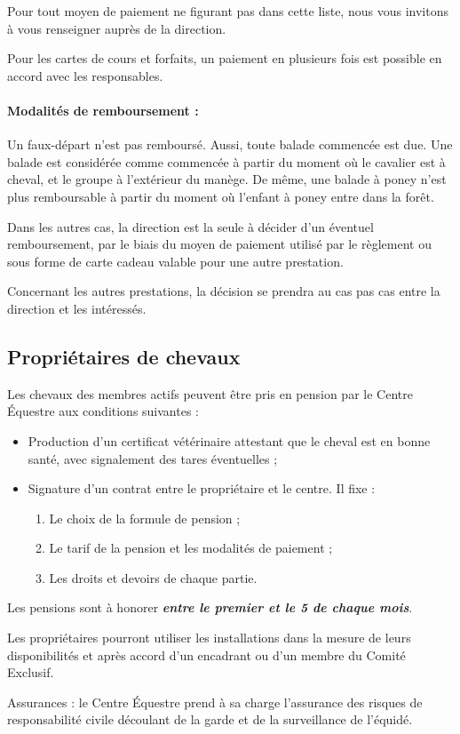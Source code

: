 \documentclass[11pt,a4paper]{article}
\begin{document}
Pour tout moyen de paiement ne figurant pas dans cette liste, nous vous invitons à vous renseigner auprès de la direction.

Pour les cartes de cours et forfaits, un paiement en plusieurs fois est possible en accord avec les responsables.

\paragraph{Modalités de remboursement :\\}

Un faux-départ n'est pas remboursé. Aussi, toute balade commencée est due. Une balade est considérée comme \og commencée \fg{} à partir du moment où le cavalier est à cheval, et le groupe à l'extérieur du manège. De même, une balade à poney n'est plus remboursable à partir du moment où l'enfant à poney entre dans la forêt.

Dans les autres cas, la direction est la seule à décider d'un éventuel remboursement, par le biais du moyen de paiement utilisé par le règlement ou sous forme de \og carte cadeau \fg{} valable pour une autre prestation.

Concernant les autres prestations, la décision se prendra au cas pas cas entre la direction et les intéressés.


\subsection{Propriétaires de chevaux}
Les chevaux des membres actifs peuvent être pris en pension par le Centre Équestre aux conditions suivantes :
\begin{itemize}
\item
Production d'un certificat vétérinaire attestant que le cheval est en bonne santé, avec signalement des tares éventuelles ;
\item
Signature d'un contrat entre le propriétaire et le centre. Il fixe :
\begin{enumerate}
\item
Le choix de la formule de pension ;
\item
Le tarif de la pension et les modalités de paiement ;
\item
Les droits et devoirs de chaque partie.
\end{enumerate}
\end{itemize}
Les pensions sont à honorer \textit{\textbf{entre le premier et le 5 de chaque mois}}.

Les propriétaires pourront utiliser les installations dans la mesure de leurs disponibilités et après accord d'un encadrant ou d'un membre du Comité Exclusif. \par
Assurances : le Centre Équestre prend à sa charge l'assurance des risques de responsabilité civile découlant de la garde et de la surveillance de l'équidé.
\end{document}
